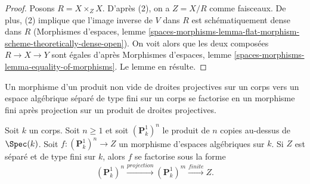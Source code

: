 \begin{proof}
Posons $R = X \times_Z X$. D'après (2), on a $Z = X/R$ comme faisceaux.
De plus, (2) implique que l'image inverse de $V$ dans $R$ est
schématiquement dense dans $R$ (Morphismes d'espaces, lemme
\ref{spaces-morphisms-lemma-flat-morphism-scheme-theoretically-dense-open}).
On voit alors que les deux composées
$R \to X \to Y$ sont égales d'après Morphismes d'espaces, lemme
\ref{spaces-morphisms-lemma-equality-of-morphisms}.
Le lemme en résulte.
\end{proof}

\begin{lemma}
\label{lemma-quotient-power-P1}
\begin{slogan}
Un morphisme d'un produit non vide de droites projectives sur un corps vers
un espace algébrique séparé de type fini sur un corps se factorise en un
morphisme fini après projection sur un produit de droites projectives.
\end{slogan}
Soit $k$ un corps. Soit $n \geq 1$ et soit $(\mathbf{P}^1_k)^n$
le produit de $n$ copies au-dessus de $\Spec(k)$. Soit
$f : (\mathbf{P}^1_k)^n \to Z$ un morphisme d'espaces algébriques sur $k$.
Si $Z$ est séparé et de type fini sur $k$, alors $f$ se factorise sous la forme
$$
(\mathbf{P}^1_k)^n \xrightarrow{projection}
(\mathbf{P}^1_k)^m \xrightarrow{finite} Z.
$$
\end{lemma}

